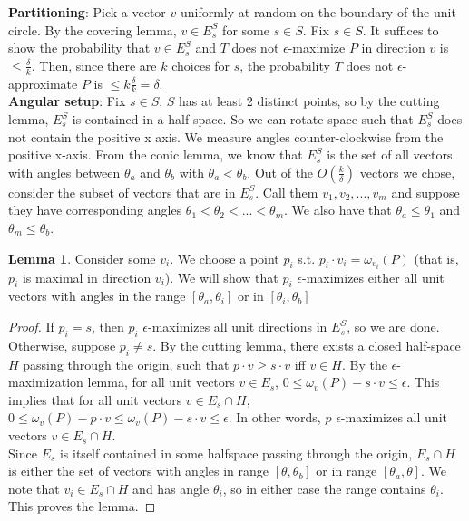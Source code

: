 \documentclass[12pt]{article}
\theoremstyle{definition}
\theoremstyle{lemma}
\newtheorem{lemma}{Lemma}[section]
\theoremstyle{theorem}
\begin{document}
\textbf{Partitioning}: Pick a vector $v$ uniformly at random on the boundary of the unit circle. By the covering lemma, $v \in E^S_s$ for some $s \in S$. Fix $s \in S$. It suffices to show the probability that $v \in E^S_s$ and $T$ does not $\epsilon$-maximize $P$ in direction $v$ is $\leq \frac{\delta}{k}$. Then, since there are $k$ choices for $s$, the probability $T$ does not $\epsilon$-approximate $P$ is $\leq k\frac{\delta}{k} = \delta$.
\\

\textbf{Angular setup}: Fix $s \in S$. $S$ has at least 2 distinct points, so by the cutting lemma, $E^S_s$ is contained in a half-space. So we can rotate space such that $E^S_s$ does not contain the positive x axis. We measure angles counter-clockwise from the positive x-axis. From the conic lemma, we know that $E^S_s$ is the set of all vectors with angles between $\theta_a$ and $\theta_b$ with $\theta_a < \theta_b$. Out of the $O(\frac{k}{\delta})$ vectors we chose, consider the subset of vectors that are in $E^S_s$. Call them $v_1, v_2, ..., v_m$ and suppose they have corresponding angles $\theta_1 < \theta_2 < ... < \theta_m$. We also have that $\theta_a \leq \theta_1$ and $\theta_m \leq \theta_b$.
\\

\begin{lemma}
Consider some $v_i$. We choose a point $p_i$ s.t. $p_i \cdot v_i = \omega_{v_i}(P)$ (that is, $p_i$ is maximal in direction $v_i$). We will show that $p_i$ $\epsilon$-maximizes either all unit vectors with angles in the range $[\theta_a, \theta_i]$ or in $[\theta_i, \theta_b]$
\end{lemma}

\begin{proof}
If $p_i = s$, then $p_i$ $\epsilon$-maximizes all unit directions in $E^S_s$, so we are done. Otherwise, suppose $p_i \neq s$. By the cutting lemma, there exists a closed half-space $H$ passing through the origin, such that $p \cdot v \geq s \cdot v$ iff $v \in H$. By the $\epsilon$-maximization lemma, for all unit vectors $v \in E_s$, $0 \leq \omega_v(P) - s \cdot v \leq \epsilon$. This implies that for all unit vectors $v \in E_s \cap H$, $0 \leq \omega_v(P) - p \cdot v \leq \omega_v(P) - s \cdot v \leq \epsilon$. In other words, $p$ $\epsilon$-maximizes all unit vectors $v \in E_s \cap H$.
\\

Since $E_s$ is itself contained in some halfspace passing through the origin, $E_s \cap H$ is either the set of vectors with angles in range $[\theta, \theta_b]$ or in range $[\theta_a, \theta]$. We note that $v_i \in E_s \cap H$ and has angle $\theta_i$, so in either case the range contains $\theta_i$. This proves the lemma.
\end{proof}
\end{document}
